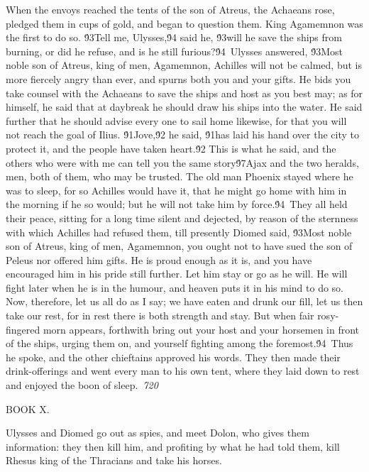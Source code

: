 {When the envoys reached the tents of the son of Atreus, the Achaeans rose, pledged them in cups of gold, and began to question them. King Agamemnon was the first to do so. \'93Tell me, Ulysses,\'94 said he, \'93will he save the ships from burning, or did he refuse, and is he still furious?\'94\
Ulysses answered, \'93Most noble son of Atreus, king of men, Agamemnon, Achilles will not be calmed, but is more fiercely angry than ever, and spurns both you and your gifts. He bids you take counsel with the Achaeans to save the ships and host as you best may; as for himself, he said that at daybreak he should draw his ships into the water. He said further that he should advise every one to sail home likewise, for that you will not reach the goal of Ilius. \'91Jove,\'92 he said, \'91has laid his hand over the city to protect it, and the people have taken heart.\'92 This is what he said, and the others who were with me can tell you the same story\'97Ajax and the two heralds, men, both of them, who may be trusted. The old man Phoenix stayed where he was to sleep, for so Achilles would have it, that he might go home with him in the morning if he so would; but he will not take him by force.\'94\
They all held their peace, sitting for a long time silent and dejected, by reason of the sternness with which Achilles had refused them, till presently Diomed said, \'93Most noble son of Atreus, king of men, Agamemnon, you ought not to have sued the son of Peleus nor offered him gifts. He is proud enough as it is, and you have encouraged him in his pride still further. Let him stay or go as he will. He will fight later when he is in the humour, and heaven puts it in his mind to do so. Now, therefore, let us all do as I say; we have eaten and drunk our fill, let us then take our rest, for in rest there is both strength and stay. But when fair rosy-fingered morn appears, forthwith bring out your host and your horsemen in front of the ships, urging them on, and yourself fighting among the foremost.\'94\
Thus he spoke, and the other chieftains approved his words. They then made their drink-offerings and went every man to his own tent, where they laid down to rest and enjoyed the boon of sleep.\
\pard{}\sl720\qc{}

\fs48  BOOK X.\
\pard{}\li1710\ri1710\sa64\qj\partightenfactor0

\fs25\fsmilli12800 \cf2 Ulysses and Diomed go out as spies, and meet Dolon, who gives them information: they then kill him, and profiting by what he had told them, kill Rhesus king of the Thracians and take his horses.\
\pard\pardeftab720\qj{}

}
